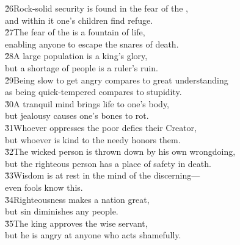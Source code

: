 \begin{poetry}
\poeml \v{26}Rock-solid security is found in the fear of the , \\
\poemll    and within it one's children find refuge. \\
\poeml \v{27}The fear of the  is a fountain of life, \\
\poemll    enabling anyone to escape the snares of death. \\
\poeml \v{28}A large population is a king's glory, \\
\poemll    but a shortage of people is a ruler's ruin. \\
\poeml \v{29}Being slow to get angry compares to great understanding \\
\poemll    as being quick-tempered compares to stupidity. \\
\poeml \v{30}A tranquil mind brings life to one's body, \\
\poemll    but jealousy causes one's bones to rot. \\
\poeml \v{31}Whoever oppresses the poor defies their Creator, \\
\poemll    but whoever is kind to the needy honors them. \\
\poeml \v{32}The wicked person is thrown down by his own wrongdoing, \\
\poemll    but the righteous person has a place of safety in death. \\
\poeml \v{33}Wisdom is at rest in the mind of the discerning--- \\
\poemll    even fools know this. \\
\poeml \v{34}Righteousness makes a nation great, \\
\poemll    but sin diminishes any people. \\
\poeml \v{35}The king approves the wise servant, \\
\poemll    but he is angry at anyone who acts shamefully.
\end{poetry}

